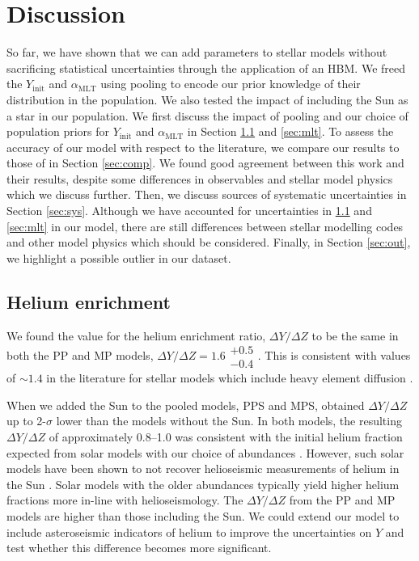 \documentclass[a4paper,fleqn,usenatbib]{mnras}
\newcommand{\mlt}{\ensuremath{{\alpha_\mathrm{MLT}}}}
\begin{document}
\section{Discussion}\label{sec:dis}


So far, we have shown that we can add parameters to stellar models without sacrificing statistical uncertainties through the application of an HBM. We freed the $Y_\mathrm{init}$ and $\mlt$ using pooling to encode our prior knowledge of their distribution in the population. We also tested the impact of including the Sun as a star in our population. We first discuss the impact of pooling and our choice of population priors for $Y_\mathrm{init}$ and $\mlt$ in Section \ref{sec:helium} and \ref{sec:mlt}. To assess the accuracy of our model with respect to the literature, we compare our results to those of  in Section \ref{sec:comp}. We found good agreement between this work and their results, despite some differences in observables and stellar model physics which we discuss further. Then, we discuss sources of systematic uncertainties in Section \ref{sec:sys}. Although we have accounted for uncertainties in \ref{sec:helium} and \ref{sec:mlt} in our model, there are still differences between stellar modelling codes and other model physics which should be considered. Finally, in Section \ref{sec:out}, we highlight a possible outlier in our dataset.

\subsection{Helium enrichment}\label{sec:helium}

We found the value for the helium enrichment ratio, $\Delta Y / \Delta Z$ to be the same in both the PP and MP models, $\Delta Y / \Delta Z = 1.6\substack{+0.5\\-0.4}$. This is consistent with values of $\sim 1.4$ in the literature for stellar models which include heavy element diffusion \citep{Brogaard.VandenBerg.ea2012, Verma.Raodeo.ea2019}.

When we added the Sun to the pooled models, PPS and MPS, obtained $\Delta Y / \Delta Z$ up to 2-$\sigma$ lower than the models without the Sun. In both models, the resulting $\Delta Y / \Delta Z$ of approximately \numrange{0.8}{1.0} was consistent with the initial helium fraction expected from solar models with our choice of \citet{Asplund.Grevesse.ea2009} abundances \citep{Serenelli.Basu2010}. However, such solar models have been shown to not recover helioseismic measurements of helium in the Sun \citep{Basu.Antia2004, Serenelli.Basu.ea2009, Villante.Serenelli.ea2014}. Solar models with the older \citet{Grevesse.Sauval1998} abundances typically yield higher helium fractions more in-line with helioseismology. The $\Delta Y / \Delta Z$ from the PP and MP models are higher than those including the Sun. We could extend our model to include asteroseismic indicators of helium to improve the uncertainties on $Y$ and test whether this difference becomes more significant.
\end{document}
